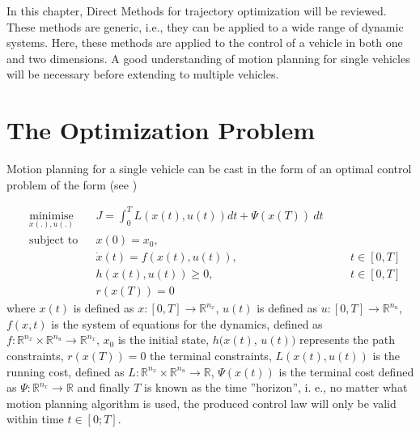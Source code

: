 %
\cleardoublepage%
\label{chap:theory}

\par In this chapter, Direct Methods for trajectory optimization will be reviewed. These methods are generic, i.e., they can be applied to a wide range of dynamic systems. Here, these methods are applied to the control of a vehicle in both one and two dimensions. A good understanding of motion planning for single vehicles will be necessary before extending to multiple vehicles.

\section{The Optimization Problem}
\label{sec:optimprob_intro}

\par Motion planning for a single vehicle can be cast in the form of an optimal control problem of the form (see \cite{diehl2006fast})

\begin{equation}
    \begin{aligned}
    & \underset{x(.),u(.)}{\text{minimise}} && J = \int_0^T L(x(t),u(t))dt + \Psi (x(T)) \ dt\\
    & \text{subject to}  && x(0) = x_0, \\
        & && \dot{x}(t) = f(x(t), u(t)), &&& t \in [0,T] \\ %
        & && h(x(t),u(t)) \geq 0, &&&  t \in [0,T] \\ %
        & && r(x(T)) = 0 %
    \end{aligned}
    \label{eq:general_cost}
\end{equation}
where $x(t)$ is defined as $x:[0,T]\rightarrow \mathbb{R}^{n_x}$, $u(t)$ is defined as $u:[0,T]\rightarrow \mathbb{R}^{n_u}$, $f(x,t)$ is the system of equations for the dynamics, defined as $f:\mathbb{R}^{n_x}\times \mathbb{R}^{n_u}\rightarrow \mathbb{R}^{n_x}$, $x_0$ is the initial state, $h(x(t)$, $u(t))$ represents the path constraints, $r(x(T))=0$ the terminal constraints, $L(x(t),u(t))$ is the running cost, defined as $L:\mathbb{R}^{n_x}\times \mathbb{R}^{n_u}\rightarrow \mathbb{R}$, $\Psi(x(t))$ is the terminal cost defined as $\Psi:\mathbb{R}^{n_x} \rightarrow \mathbb{R}$ and finally $T$ is known as the time ”horizon”, i. e., no matter what motion planning algorithm is used, the produced control law will only be valid within time $t\in[0;T]$.

